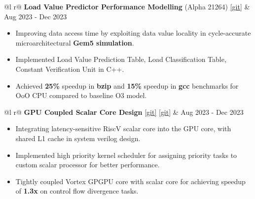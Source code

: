 \documentclass[a4paper,10pt]{article}
\begin{document}
\begin{tabularx}{\linewidth}{ @{}l r@{} }
    \textbf{Load Value Predictor Performance Modelling} (Alpha 21264) \href{https://github.com/sharathat45/load_value_predictor/tree/lvp_v1}{[\underline{git}]} 
    & \hfill {\small Aug 2023 - Dec 2023} \\[2.75pt]
    {
        \begin{minipage}[t]{\linewidth}
            \begin{itemize}[nosep, after=\strut, leftmargin=2em, itemsep=3pt]
                \item Improving data access time by exploiting data value locality in cycle-accurate microarchitectural \textbf{Gem5 simulation}. 
                \item Implemented Load Value Prediction Table, Load Classification Table, Constant Verification Unit in C++. 
                \item Achieved \textbf{25\%} speedup in \textbf{bzip} and \textbf{15\%} speedup in \textbf{gcc} benchmarks for OoO CPU compared to baseline O3 model.
            \end{itemize}
        \end{minipage}
    } 
\end{tabularx}
\vspace{0.1cm}

\begin{tabularx}{\linewidth}{ @{}l r@{} }
    \textbf{GPU Coupled Scalar Core Design} \href{https://gitfront.io/r/Sharath/tkpYU7EunMqf/GPU-scalar-riscV-design/}{[\underline{git}]} \href{https://github.com/TehkCode/Vortex-Purdue/tree/ArchV1_3}{[\underline{git}]} & \hfill {\small Aug 2023 - Dec 2023} \\[2.75pt]
    {
        \begin{minipage}[t]{\linewidth}
            \begin{itemize}[nosep,after=\strut, leftmargin=2em, itemsep=3pt]
                \item Integrating latency-sensitive RiscV scalar core into the GPU core, with shared L1 cache in system verilog design.
                \item Implemented high priority kernel scheduler for assigning priority tasks to custom scalar processor for better performance.
                \item Tightly coupled Vortex GPGPU core with scalar core for achieving speedup of \textbf{1.3x} on control flow divergence tasks. 
            \end{itemize}
        \end{minipage}
    } 
\end{tabularx}
\vspace{0.1cm}
\end{document}
